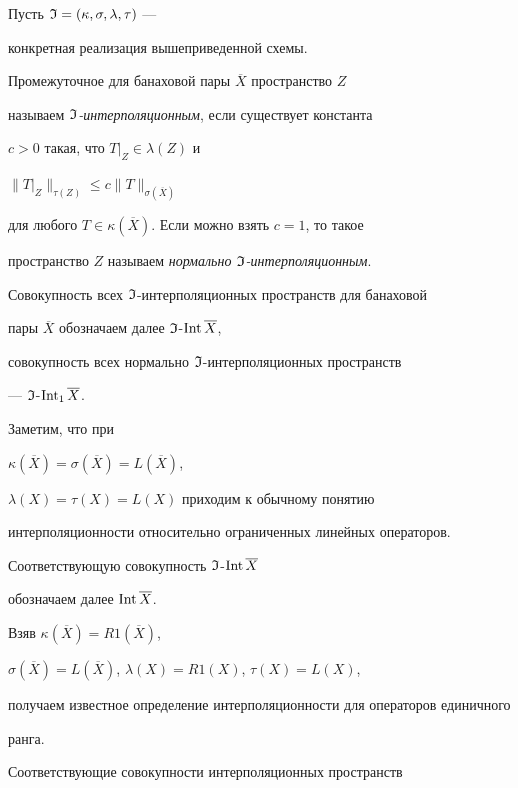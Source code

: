 \begin{defn}


Пусть $\frak I=(\kappa , \sigma , \lambda , \tau )$ ---


конкретная реализация вышеприведенной схемы.


Промежуточное для банаховой пары $\overline X$ пространство $Z$


называем $\frak I${\it-интерполяционным}, если существует константа 


$c>0$ такая, что $T | _Z \in \lambda (Z)$ и


$\| T | _Z \| _{ \tau (Z)} \le c \| T \| _{\sigma (\overline X)}$


для любого $T \in \kappa (\overline X)$. Если можно взять $c=1$, то такое


пространство $Z$ называем {\it нормально $\frak I$-интерполяционным}.


\end{defn}





Совокупность всех $\frak I$-интерполяционных пространств для банаховой 


пары $\overline{X}$ обозначаем далее $\frak I$-$\operatorname{Int}\overline X$,


совокупность всех нормально $\frak I$-интерполяционных пространств 


--- $\frak I$-$\operatorname{Int}_1 \overline X$.





Заметим, что при


$\kappa (\overline X)=\sigma (\overline X)=L(\overline X)$,


$\lambda (X)=\tau (X)=L(X)$ приходим к обычному понятию 


интерполяционности относительно ограниченных линейных операторов. 


Соответствующую совокупность $\frak I$-$\operatorname{Int}\overline X$  


обозначаем далее $\operatorname{Int}\overline X$.





Взяв $\kappa (\overline X)=R1(\overline X)$,


$\sigma (\overline X)=L(\overline X)$, $\lambda (X)=R1(X)$, $\tau (X)=L(X)$,


получаем известное определение интерполяционности для операторов единичного 


ранга. 


Соответствующие совокупности интерполяционных пространств 



